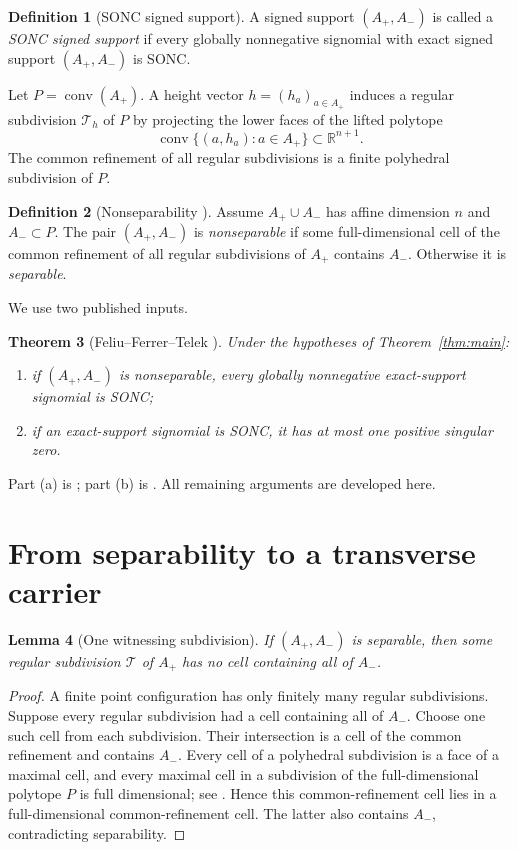 \documentclass[11pt]{article}
\theoremstyle{plain}
\newtheorem{theorem}{Theorem}[section]
\newtheorem{lemma}[theorem]{Lemma}
\theoremstyle{definition}
\newtheorem{definition}[theorem]{Definition}
\theoremstyle{remark}
\newcommand{\R}{\mathbb R}
\newcommand{\conv}{\operatorname{conv}}
\begin{document}
\begin{definition}[SONC signed support]
A signed support $(A_+,A_-)$ is called a \emph{SONC signed support} if every globally nonnegative signomial with exact signed support $(A_+,A_-)$ is SONC.
\end{definition}

Let $P=\conv(A_+)$. A height vector $h=(h_a)_{a\in A_+}$ induces a regular subdivision $\mathcal T_h$ of $P$ by projecting the lower faces of the lifted polytope
\[
 \conv\{(a,h_a):a\in A_+\}\subset\R^{n+1}.
\]
The common refinement of all regular subdivisions is a finite polyhedral subdivision of $P$.

\begin{definition}[Nonseparability \cite{FFT}]
Assume $A_+\cup A_-$ has affine dimension $n$ and $A_-\subset P$. The pair $(A_+,A_-)$ is \emph{nonseparable} if some full-dimensional cell of the common refinement of all regular subdivisions of $A_+$ contains $A_-$. Otherwise it is \emph{separable}.
\end{definition}

We use two published inputs.

\begin{theorem}[Feliu--Ferrer--Telek \cite{FFT}]\label{thm:FFT}
Under the hypotheses of Theorem~\ref{thm:main}:
\begin{enumerate}[label=\textup{(\alph*)}]
\item if $(A_+,A_-)$ is nonseparable, every globally nonnegative exact-support signomial is SONC;
\item if an exact-support signomial is SONC, it has at most one positive singular zero.
\end{enumerate}
\end{theorem}

Part \textup{(a)} is \cite[Theorem~3.16]{FFT}; part \textup{(b)} is \cite[Lemma~3.7]{FFT}. All remaining arguments are developed here.

\section{From separability to a transverse carrier}

\begin{lemma}[One witnessing subdivision]\label{lem:witness-subdivision}
If $(A_+,A_-)$ is separable, then some regular subdivision $\mathcal T$ of $A_+$ has no cell containing all of $A_-$.
\end{lemma}

\begin{proof}
A finite point configuration has only finitely many regular subdivisions. Suppose every regular subdivision had a cell containing all of $A_-$. Choose one such cell from each subdivision. Their intersection is a cell of the common refinement and contains $A_-$. Every cell of a polyhedral subdivision is a face of a maximal cell, and every maximal cell in a subdivision of the full-dimensional polytope $P$ is full dimensional; see \cite[Chapter~2]{DLRS}. Hence this common-refinement cell lies in a full-dimensional common-refinement cell. The latter also contains $A_-$, contradicting separability.
\end{proof}
\end{document}
